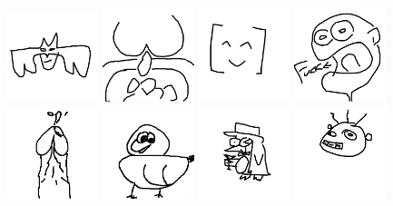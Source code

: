 \includegraphics[width=0.2\textwidth]{art/Safari_30.png}
\includegraphics[width=0.2\textwidth]{art/Safari_31.png}
\includegraphics[width=0.2\textwidth]{art/Safari_32.png}
\includegraphics[width=0.2\textwidth]{art/Safari_33.png}
\includegraphics[width=0.2\textwidth]{art/Safari_34.png}
\includegraphics[width=0.2\textwidth]{art/Safari_35.png}
\includegraphics[width=0.2\textwidth]{art/Safari_36.png}
\includegraphics[width=0.2\textwidth]{art/Safari_37.png}
